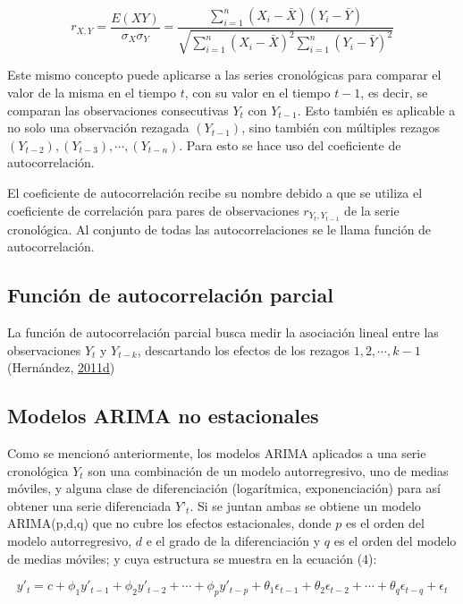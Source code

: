 \documentclass[]{article}
\begin{document}
\begin{equation}
r_{X,Y}=\frac{E(XY)}{\sigma_X \sigma_Y} = \frac{\sum_{i=1}^n \left(X_i- \bar X\right) \left(Y_i- \bar Y\right)}{\sqrt{\sum_{i=1}^n \left(X_i- \bar X\right)^2 \sum_{i=1}^n \left(Y_i- \bar Y\right)^2}}
\end{equation}

Este mismo concepto puede aplicarse a las series cronológicas para
comparar el valor de la misma en el tiempo \(t\), con su valor en el
tiempo \(t-1\), es decir, se comparan las observaciones consecutivas
\(Y_t\) con \(Y_{t-1}\). Esto también es aplicable a no solo una
observación rezagada \((Y_{t-1})\), sino también con múltiples rezagos
\((Y_{t-2}), (Y_{t-3}), \cdots,(Y_{t-n})\). Para esto se hace uso del
coeficiente de autocorrelación.

El coeficiente de autocorrelación recibe su nombre debido a que se
utiliza el coeficiente de correlación para pares de observaciones
\(r_{Y_t, Y_{t-1}}\) de la serie cronológica. Al conjunto de todas las
autocorrelaciones se le llama función de autocorrelación.

\subsection{Función de autocorrelación parcial}

La función de autocorrelación parcial busca medir la asociación lineal
entre las observaciones \(Y_t\) y \(Y_{t-k}\), descartando los efectos
de los rezagos \(1,2, \cdots ,k-1\)(Hernández,
\protect\hyperlink{ref-oscarh-4}{2011}\protect\hyperlink{ref-oscarh-4}{d})

\subsection{Modelos ARIMA no estacionales}

Como se mencionó anteriormente, los modelos ARIMA aplicados a una serie
cronológica \(Y_t\) son una combinación de un modelo autorregresivo, uno
de medias móviles, y alguna clase de diferenciación (logarítmica,
exponenciación) para así obtener una serie diferenciada \(Y’_t\). Si se
juntan ambas se obtiene un modelo ARIMA(p,d,q) que no cubre los efectos
estacionales, donde \(p\) es el orden del modelo autorregresivo, \(d\) e
el grado de la diferenciación y \(q\) es el orden del modelo de medias
móviles; y cuya estructura se muestra en la ecuación (4):

\begin{equation}
y'_t=c+\phi_1y'_{t-1}+\phi_2y'_{t-2}+\cdots+\phi_py'_{t-p}+\theta_1\epsilon_{t-1}+\theta_2\epsilon_{t-2}+\cdots+\theta_q\epsilon_{t-q} +\epsilon_t
\end{equation}
\end{document}
